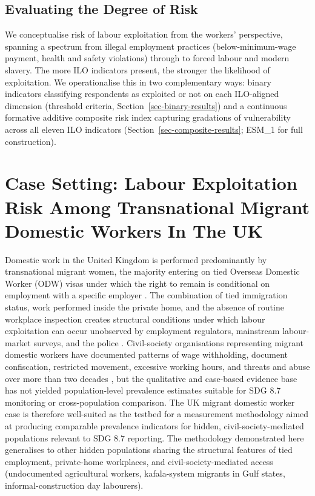 \documentclass[
  12pt,
  letterpaper,
  DIV=11,
  numbers=noendperiod]{scrartcl}
\begin{document}
\subsection{Evaluating the Degree of Risk}\label{sec-degree-of-risk}

We conceptualise risk of labour exploitation from the workers'
perspective, spanning a spectrum from illegal employment practices
(below-minimum-wage payment, health and safety violations) through to
forced labour and modern slavery. The more ILO indicators present, the
stronger the likelihood of exploitation. We operationalise this in two
complementary ways: binary indicators classifying respondents as
exploited or not on each ILO-aligned dimension (threshold criteria,
Section~\ref{sec-binary-results}) and a continuous formative additive
composite risk index capturing gradations of vulnerability across all
eleven ILO indicators (Section~\ref{sec-composite-results}; ESM\_1 for
full construction).

\section{Case Setting: Labour Exploitation Risk Among Transnational
Migrant Domestic Workers In The UK}\label{sec-case-setting}

Domestic work in the United Kingdom is performed predominantly by
transnational migrant women, the majority entering on tied Overseas
Domestic Worker (ODW) visas under which the right to remain is
conditional on employment with a specific employer
\autocite{mant16-modern,kala08-new,serv23-closed}. The combination of
tied immigration status, work performed inside the private home, and the
absence of routine workplace inspection creates structural conditions
under which labour exploitation can occur unobserved by employment
regulators, mainstream labour-market surveys, and the police
\autocite{romero_blueprint_2025}. Civil-society organisations
representing migrant domestic workers have documented patterns of wage
withholding, document confiscation, restricted movement, excessive
working hours, and threats and abuse over more than two decades
\autocite{kala08-new,mant16-modern,serv23-closed,yilm23-exploring}, but
the qualitative and case-based evidence base has not yielded
population-level prevalence estimates suitable for SDG 8.7 monitoring or
cross-population comparison. The UK migrant domestic worker case is
therefore well-suited as the testbed for a measurement methodology aimed
at producing comparable prevalence indicators for hidden,
civil-society-mediated populations relevant to SDG 8.7 reporting. The
methodology demonstrated here generalises to other hidden populations
sharing the structural features of tied employment, private-home
workplaces, and civil-society-mediated access (undocumented agricultural
workers, kafala-system migrants in Gulf states, informal-construction
day labourers).
\end{document}
